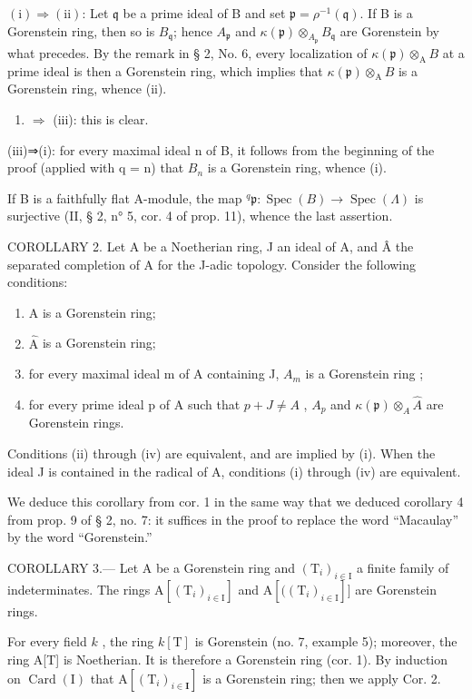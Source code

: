 \((\mathrm{i}) \Rightarrow (\mathrm{ii})\): Let \(\mathfrak{q}\) be a prime ideal of B and set \(\mathfrak{p} = \rho^{-1}(\mathfrak{q})\). If B is a Gorenstein ring, then so is \(B_{\mathfrak{q}}\); hence \(A_{\mathfrak{p}}\) and \(\kappa(\mathfrak{p}) \otimes_{A_{\mathfrak{p}}} B_{\mathfrak{q}}\) are Gorenstein by what precedes. By the remark in § 2, No. 6, every localization of \(\kappa(\mathfrak{p}) \otimes_{\mathrm{A}} B\) at a prime ideal is then a Gorenstein ring, which implies that \(\kappa(\mathfrak{p}) \otimes_{\mathrm{A}} B\) is a Gorenstein ring, whence (ii).

\begin{enumerate}
\def\labelenumi{(\roman{enumi})}
\setcounter{enumi}{1}
\tightlist
\item
  \(\Rightarrow\) (iii): this is clear.
\end{enumerate}

(iii)⇒(i): for every maximal ideal n of B, it follows from the beginning of the proof (applied with q = n) that \(B_{n}\) is a Gorenstein ring, whence (i).

If B is a faithfully flat A-module, the map \(^{q}\mathfrak{p}:\operatorname{Spec}(B)\longrightarrow\operatorname{Spec}(\Lambda)\) is surjective (II, § 2, n° 5, cor. 4 of prop. 11), whence the last assertion.

COROLLARY 2. Let A be a Noetherian ring, J an ideal of A, and Â the separated completion of A for the J-adic topology. Consider the following conditions:

\begin{enumerate}
\def\labelenumi{(\roman{enumi})}
\item
  A is a Gorenstein ring;
\item
  \(\widehat{\mathrm{A}}\) is a Gorenstein ring;
\item
  for every maximal ideal m of A containing J, \(A_{m}\) is a Gorenstein ring ;
\item
  for every prime ideal p of A such that \(p + J \neq A\) , \(A_{p}\) and \(\kappa(\mathfrak{p}) \otimes_{A} \widehat{A}\) are Gorenstein rings.
\end{enumerate}

Conditions (ii) through (iv) are equivalent, and are implied by (i). When the ideal J is contained in the radical of A, conditions (i) through (iv) are equivalent.

We deduce this corollary from cor. 1 in the same way that we deduced corollary 4 from prop. 9 of § 2, no. 7: it suffices in the proof to replace the word “Macaulay” by the word “Gorenstein.”

COROLLARY 3.--- Let A be a Gorenstein ring and \((\mathrm{T}_{i})_{i\in\mathrm{I}}\) a finite family of indeterminates. The rings \(\mathrm{A}[(\mathrm{T}_{i})_{i\in\mathrm{I}}]\) and \(\mathrm{A}[((\mathrm{T}_{i})_{i\in\mathrm{I}}]]\) are Gorenstein rings.

For every field \(k\) , the ring \(k[\mathrm{T}]\) is Gorenstein (no. 7, example 5); moreover, the ring A{[}T{]} is Noetherian. It is therefore a Gorenstein ring (cor. 1). By induction on \(\operatorname{Card}(\mathrm{I})\) that \(\mathrm{A}[(\mathrm{T}_i)_{i\in \mathbf{I}}]\) is a Gorenstein ring; then we apply Cor. 2.

